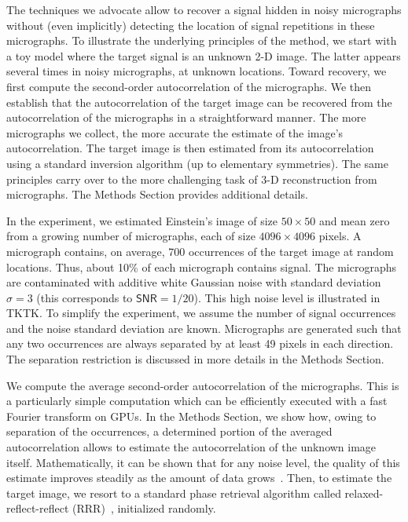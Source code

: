 \documentclass[english,11pt]{article}
\newcommand{\1}{\mathbf{1}}
\newcommand{\TODO}[1]{{\color{red}{[#1]}}}
\numberwithin{equation}{section}
\theoremstyle{plain}
\theoremstyle{definition}
\theoremstyle{remark}
\theoremstyle{plain}
\theoremstyle{remark}
\theoremstyle{plain}
\theoremstyle{plain}
\newcommand{\SNR}{\ensuremath{\textsf{SNR}}}
\begin{document}
The techniques we advocate allow to recover a signal hidden in noisy micrographs without (even implicitly) detecting the location of signal repetitions in these micrographs. To illustrate the underlying principles of the method, we start with a toy model where the target signal is an unknown 2-D image. The latter appears several times in noisy micrographs, at unknown locations. Toward recovery, we first compute the second-order autocorrelation of the micrographs. We then establish that the autocorrelation of the target image can be recovered from the autocorrelation of the micrographs in a straightforward manner. The more micrographs we collect, the more accurate the estimate of the image's autocorrelation. 
The target image is then estimated from its autocorrelation using a standard inversion algorithm (up to elementary symmetries).
The same principles carry over to the more challenging task of 3-D reconstruction from micrographs.
The Methods Section provides additional details. 

In the  experiment, we estimated Einstein's image of size $50\times 50$ and mean zero from a growing number of micrographs, each of size $4096\times 4096$ pixels. A micrograph contains, on average, 700 occurrences of the target image at random locations. 
Thus, about 10\% of each micrograph contains signal. The micrographs are contaminated with additive white Gaussian noise with standard deviation $\sigma=3$ (this corresponds to $\SNR=1/20$). This high noise level is illustrated in TKTK. %
To simplify the experiment, we assume the number of signal occurrences and the noise standard deviation are known. Micrographs are generated such that any two occurrences are always separated by at least 49 pixels in each direction. The separation restriction is discussed in more details in the Methods Section.

We compute the average second-order autocorrelation of the micrographs. This is a particularly simple computation which can be efficiently executed with a fast Fourier transform on GPUs. In the Methods Section, we show how, owing to separation of the occurrences, a determined portion of the averaged autocorrelation allows to estimate the autocorrelation of the unknown image itself. Mathematically, it can be shown that for any noise level, the quality of this estimate improves steadily as the amount of data grows~\cite{bendory2018estimation}. Then, to estimate the target image, we resort to a standard phase retrieval algorithm called relaxed-reflect-reflect (RRR)~\cite{elser2017rrr}, initialized randomly.
\end{document}
